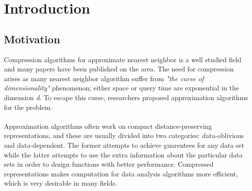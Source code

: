\section{Introduction}
\label{introduction}
\subsection{Motivation} %
Compression algorithms for approximate nearest neighbor is a well studied field and many papers have been published on the area. The need for compression arises as many nearest neighbor algorithm suffer from \textit{"the curse of dimensionality"} phenomenon; either space or query time are exponential in the dimension \textit{d}. To escape this curse,
researchers proposed approximation algorithms for the problem.\cite{ilya15} 
\\
\\
Approximation algorithms often work on compact distance-preserving representations, and these are usually divided into two categories: data-oblivious and data-dependent. The former attempts to achieve guarentees for any data set while the latter attempts to use the extra information about the particular data sets in order to design functions with better performance. Compressed representations makes computation for data analysis algorithms more efficient, which is very desirable in many fields.\cite{stan15}
